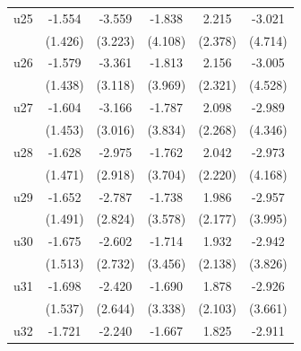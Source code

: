 \begin{table}[htbp]
\begin{tabular}{l*{5}{c}}
\addlinespace
u25                 &      -1.554         &      -3.559         &      -1.838         &       2.215         &      -3.021         \\
                    &     (1.426)         &     (3.223)         &     (4.108)         &     (2.378)         &     (4.714)         \\
\addlinespace
u26                 &      -1.579         &      -3.361         &      -1.813         &       2.156         &      -3.005         \\
                    &     (1.438)         &     (3.118)         &     (3.969)         &     (2.321)         &     (4.528)         \\
\addlinespace
u27                 &      -1.604         &      -3.166         &      -1.787         &       2.098         &      -2.989         \\
                    &     (1.453)         &     (3.016)         &     (3.834)         &     (2.268)         &     (4.346)         \\
\addlinespace
u28                 &      -1.628         &      -2.975         &      -1.762         &       2.042         &      -2.973         \\
                    &     (1.471)         &     (2.918)         &     (3.704)         &     (2.220)         &     (4.168)         \\
\addlinespace
u29                 &      -1.652         &      -2.787         &      -1.738         &       1.986         &      -2.957         \\
                    &     (1.491)         &     (2.824)         &     (3.578)         &     (2.177)         &     (3.995)         \\
\addlinespace
u30                 &      -1.675         &      -2.602         &      -1.714         &       1.932         &      -2.942         \\
                    &     (1.513)         &     (2.732)         &     (3.456)         &     (2.138)         &     (3.826)         \\
\addlinespace
u31                 &      -1.698         &      -2.420         &      -1.690         &       1.878         &      -2.926         \\
                    &     (1.537)         &     (2.644)         &     (3.338)         &     (2.103)         &     (3.661)         \\
\addlinespace
u32                 &      -1.721         &      -2.240         &      -1.667         &       1.825         &      -2.911         \\

\end{tabular}
\end{table}
